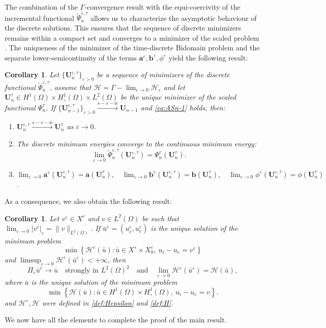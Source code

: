 \documentclass[a4paper,11pt]{article}
\newtheorem{corollary}[theorem]{Corollary}
\theoremstyle{definition}
\numberwithin{equation}{section}
\newcommand{\e}{\varepsilon}
\begin{document}
The combination of the $\Gamma$-convergence result with the equi-coercivity of the incremental functional $\widetilde\Psi_n^{\e,\tau}$ allows us to characterize the asymptotic behaviour of the discrete solutions. This ensures that the sequence of discrete minimizers remains within a compact set and converges to a minimizer of the scaled problem \cite[Corollary 7.20]{DM93}. The uniqueness of the minimizer of the time-discrete Bidomain problem and the separate lower-semicontinuity of the terms $\mathbf{a}^\e, \mathbf{b}^\e, \phi^\e$ yield the following result:
\begin{corollary}
	Let $\{\mathbf{U}_n^{\e, \tau}\}_{\e>0}$ be a sequence of minimizers of the discrete functional $\widetilde\Psi_n^{\e, \tau}$, assume that $\mathcal H = \Gamma-\lim_{\e\to 0}\mathcal H_\e$  and let $\mathbf{U}_n^\tau \in H^1(\Omega)\times H^1_\circ(\Omega)\times L^2(\Omega)$ be the unique minimizer of the scaled functional $\Psi_n^\tau$. If  $\{\mathbf{U}_{n-1}^{\e,\tau}\}_{\e > 0}  \xrightarrow{s-s-w} \mathbf{U}_{n-1}$ and \eqref{eq:ASn-1} holds, then:
	\begin{enumerate}
		\item[(i)] $\mathbf{U}_n^{\e, \tau} \xrightarrow{s-s-w} \mathbf{U}_n^\tau$ as $\e \to 0$.%
	\item[(ii)] The discrete minimum energies converge to the continuous minimum energy:
	\begin{equation*}
		\lim_{\e \to 0} \widetilde\Psi_n^{\e, \tau}(\mathbf{U}_n^{\e, \tau}) = \Psi_n^\tau(\mathbf{U}_n^\tau).
	\end{equation*}
	\item[(iii)] $\displaystyle \lim_{\e \to 0} \mathbf{a}^{\e}(\mathbf{U}_n^{\e, \tau}) = \mathbf{a}(\mathbf{U}_n^\tau),\quad \lim_{\e \to 0} \mathbf{b}^{\e}(\mathbf{U}_n^{\e, \tau}) = \mathbf{b}(\mathbf{U}_n^\tau),\quad \lim_{\e \to 0} \phi^{\e}(\mathbf{U}_n^{\e, \tau}) = \phi(\mathbf{U}_n^\tau)$.
\end{enumerate}
\end{corollary}
As a consequence, we also obtain the following result:
\begin{corollary}
\label{cor:minimizers}
Let $v^\e \in X^\e$ and $v\in L^2(\Omega)$ be such that
\(
\lim_{\e \to 0}|v^\e|_\e = \|v\|_{L^2(\Omega)}.
\) 
If $\bar u^\e = (u_i^\e,u_e^\e)$ is the unique solution of the minimum problem
\[
\min \left\{ \mathcal{H}^\e(\bar u): \bar u \in X^\e \times X_0^\e,\ u_i-u_e = v^\e \right\} 
\]
and $\limsup_{\e\to 0} \mathcal{H}^\e(\bar u^\e)<+\infty$, then
\[
\Pi_\e \bar u^\e \to \bar u\quad \text{strongly in }L^2(\Omega)^2\quad 
\text{and}\quad  \lim_{\e \to 0}\mathcal{H}^\e(\bar u^\e)=\mathcal{H}(\bar u),
\]
where $\bar u$ is the unique solution of the minimum problem
\[
\min \left\{ \mathcal{H}(\bar u): \bar u \in H^1(\Omega) \times H^1_\circ(\Omega),\ u_i-u_e = v \right\}.
\]
and $\mathcal{H}^\e,\mathcal{H}$ were defined in \eqref{def:Hepsilon} and \eqref{def:H}.
\end{corollary}
We now have all the elements to complete the proof of the main result.
\end{document}
